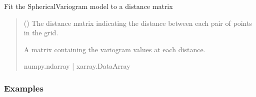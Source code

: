 \documentclass[letterpaper,10pt,english]{sphinxmanual}
\begin{document}
\begin{fulllineitems}
\begin{quote}
\begin{description}
\begin{itemize}
\end{itemize}

\end{description}\end{quote}

\begin{fulllineitems}
\label{\detokenize{covariance:glomar_gridding.variogram.SphericalVariogram.fit}}
\pysigstartsignatures
\pysiglinewithargsret
{}
{}
{}
\pysigstopsignatures
\sphinxAtStartPar
Fit the SphericalVariogram model to a distance matrix
\begin{quote}\begin{description}
\sphinxAtStartPar
{} (\sphinxstyleliteralemphasis{\sphinxupquote{ | }}) \textendash{} The distance matrix indicating the distance between each pair of
points in the grid.

\sphinxAtStartPar
A matrix containing the variogram values at each distance.

\sphinxAtStartPar
numpy.ndarray | xarray.DataArray

\end{description}\end{quote}
\subsubsection*{Examples}

\begin{sphinxVerbatim}[commandchars=\\\{\}]
  
\end{sphinxVerbatim}

\end{fulllineitems}


\end{fulllineitems}
\end{document}
